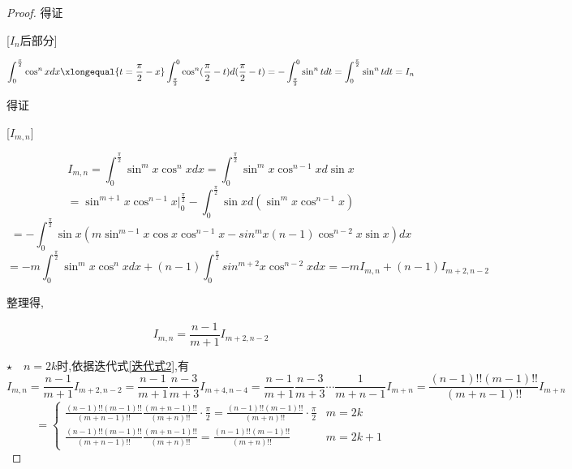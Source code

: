 \begin{proof}
    得证

    [$I_n$后部分]

    \begin{equation*}
        \int_{0}^{\frac{\pi}{2}} \cos^n xdx
        \xlongequal{t=\frac{\pi}{2}-x}
        \int_{\frac{\pi}{2}}^{0}\cos^n (\frac{\pi}{2}-t)d(\frac{\pi}{2}-t) = - \int_{\frac{\pi}{2}}^{0}\sin^n tdt
        = \int_{0}^{\frac{\pi}{2}} \sin^n tdt =I_n 
    \end{equation*}

    得证

    [$I_{m,n}$]

    \begin{equation*}
        I_{m,n} = \int_{0}^{\frac{\pi}{2}}\sin^m x \cos^n xdx
        = \int_{0}^{\frac{\pi}{2}}\sin^m x \cos^{n-1} xd \sin x
    \end{equation*}
    \begin{equation*}
        = \sin^{m+1} x \cos^{n-1} x |_{0}^{\frac{\pi}{2}}-
        \int_{0}^{\frac{\pi}{2}}\sin x d (\sin^m x \cos^{n-1}x) 
    \end{equation*}
    \begin{equation*}
        =-\int_{0}^{\frac{\pi}{2}}\sin x  (m\sin^{m-1}x \cos x \cos^{n-1}x - sin^m x (n-1)\cos^{n-2} x \sin x) dx
    \end{equation*}
    \begin{equation*}
        =-m\int_{0}^{\frac{\pi}{2}}\sin^m x \cos^{n}xdx +(n-1) \int_{0}^{\frac{\pi}{2}} sin^{m+2} x \cos^{n-2} x dx
        = -m I_{m,n}+(n-1)I_{m+2,n-2}
    \end{equation*}

    整理得,

    \begin{equation}
        I_{m,n} = \frac{n-1}{m+1} I_{m+2,n-2}   \label{迭代式2}
    \end{equation}

    \vspace{8pt}
    $\star \quad n=2k$时,依据迭代式\ref{迭代式2},有
    \begin{equation*}
        I_{m,n}=\frac{n-1}{m+1} I_{m+2,n-2}
        = \frac{n-1}{m+1} \frac{n-3}{m+3} I_{m+4,n-4}
        = \frac{n-1}{m+1} \frac{n-3}{m+3}\cdots \frac{1}{m+n-1} I_{m+n}
        = \frac{(n-1)!!(m-1)!!}{(m+n-1)!!} I_{m+n}
    \end{equation*}
    \begin{equation}
        =
        \begin{cases}
            \frac{(n-1)!!(m-1)!!}{(m+n-1)!!} \frac{(m+n-1)!!}{(m+n)!!} \cdot \frac{\pi}{2}=\frac{(n-1)!!(m-1)!!}{(m+n)!!} \cdot \frac{\pi}{2}& m=2k\\
            \frac{(n-1)!!(m-1)!!}{(m+n-1)!!} \frac{(m+n-1)!!}{(m+n)!!} = \frac{(n-1)!!(m-1)!!}{(m+n)!!} & m=2k+1 \label{1.38}
        \end{cases}
    \end{equation}


\end{proof}
